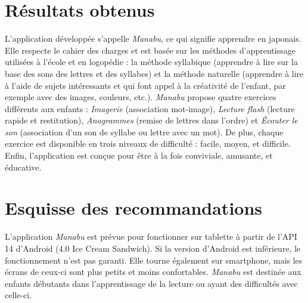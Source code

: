 \documentclass[11pt]{article}
\begin{document}
\section{Résultats obtenus}
L'application développée s'appelle \textit{Manabu}, ce qui signifie apprendre en japonais. Elle respecte le cahier des charges et est basée sur les méthodes d'apprentissage utilisées à l'école et en logopédie : la méthode syllabique (apprendre à lire sur la base des sons des lettres et des syllabes) et la méthode naturelle (apprendre à lire à l'aide de sujets intéressants et qui font appel à la créativité de l'enfant, par exemple avec des images, couleurs, etc.). \textit{Manabu} propose quatre exercices différents aux enfants : \textit{Imagerie} (association mot-image), \textit{Lecture flash} (lecture rapide et restitution), \textit{Anagrammes} (remise de lettres dans l'ordre) et \textit{Écouter le son} (association d'un son de syllabe ou lettre avec un mot). De plus, chaque exercice est disponible en trois niveaux de difficulté : facile, moyen, et difficile. Enfin, l'application est conçue pour être à la fois conviviale, amusante, et éducative.

\section{Esquisse des recommandations}
L'application \textit{Manabu} est prévue pour fonctionner sur tablette à partir de l'API 14 d'Android (4.0 Ice Cream Sandwich). Si la version d'Android est inférieure, le fonctionnement n'est pas garanti. Elle tourne également sur smartphone, mais les écrans de ceux-ci sont plus petits et moins confortables. \textit{Manabu} est destinée aux enfants débutants dans l'apprentissage de la lecture ou ayant des difficultés avec celle-ci.
\end{document}
